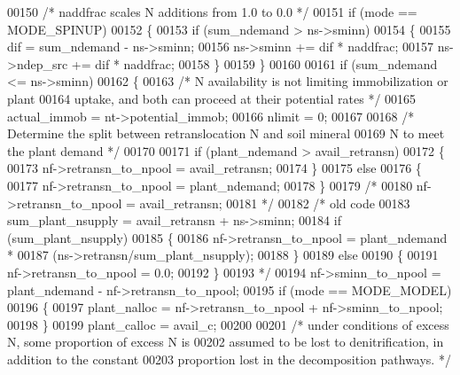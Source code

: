 \begin{DoxyCode}
00150     \textcolor{comment}{/* naddfrac scales N additions from 1.0 to 0.0 */}
00151     \textcolor{keywordflow}{if} (mode == MODE\_SPINUP)
00152     \{
00153         \textcolor{keywordflow}{if} (sum\_ndemand > ns->sminn)
00154         \{
00155             dif = sum\_ndemand - ns->sminn;
00156             ns->sminn += dif * naddfrac;
00157             ns->ndep\_src += dif * naddfrac;
00158         \}
00159     \}
00160 
00161     \textcolor{keywordflow}{if} (sum\_ndemand <= ns->sminn)
00162     \{
00163         \textcolor{comment}{/* N availability is not limiting immobilization or plant}
00164 \textcolor{comment}{        uptake, and both can proceed at their potential rates */}
00165         actual\_immob = nt->potential\_immob;
00166         nlimit = 0;
00167         
00168         \textcolor{comment}{/* Determine the split between retranslocation N and soil mineral}
00169 \textcolor{comment}{        N to meet the plant demand */}
00170         
00171         \textcolor{keywordflow}{if} (plant\_ndemand > avail\_retransn)
00172         \{
00173             nf->retransn\_to\_npool = avail\_retransn;
00174         \}
00175         \textcolor{keywordflow}{else}
00176         \{
00177             nf->retransn\_to\_npool = plant\_ndemand;
00178         \}
00179         \textcolor{comment}{/*}
00180 \textcolor{comment}{        nf->retransn\_to\_npool = avail\_retransn;}
00181 \textcolor{comment}{        */}
00182         \textcolor{comment}{/* old code}
00183 \textcolor{comment}{        sum\_plant\_nsupply = avail\_retransn + ns->sminn;}
00184 \textcolor{comment}{        if (sum\_plant\_nsupply)}
00185 \textcolor{comment}{        \{}
00186 \textcolor{comment}{            nf->retransn\_to\_npool = plant\_ndemand *}
00187 \textcolor{comment}{                (ns->retransn/sum\_plant\_nsupply);}
00188 \textcolor{comment}{        \}}
00189 \textcolor{comment}{        else}
00190 \textcolor{comment}{        \{}
00191 \textcolor{comment}{            nf->retransn\_to\_npool = 0.0;}
00192 \textcolor{comment}{        \}}
00193 \textcolor{comment}{        */}
00194         nf->sminn\_to\_npool = plant\_ndemand - nf->retransn\_to\_npool;
00195         \textcolor{keywordflow}{if} (mode == MODE\_MODEL)
00196         \{
00197             plant\_nalloc = nf->retransn\_to\_npool + nf->sminn\_to\_npool;
00198         \}
00199         plant\_calloc = avail\_c;
00200 
00201         \textcolor{comment}{/* under conditions of excess N, some proportion of excess N is}
00202 \textcolor{comment}{        assumed to be lost to denitrification, in addition to the constant}
00203 \textcolor{comment}{        proportion lost in the decomposition pathways. */}

\end{DoxyCode}
